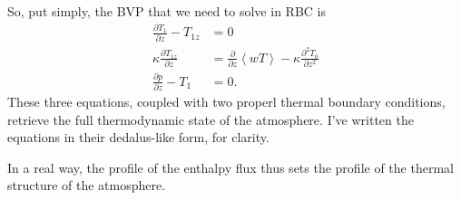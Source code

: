 \documentclass[aps, pre, onecolumn, nofootinbib, notitlepage, groupedaddress, amsfonts, amssymb, amsmath, longbibliography]{revtex4-1}
\newcommand{\angles}[1]{\ensuremath{\left\langle #1 \right\rangle}}
\begin{document}
\begin{enumerate}
So, put simply, the BVP that we need to solve in RBC is 
\begin{equation}
\begin{split}
\frac{\partial T_1}{\partial z} - T_{1z} &= 0 \\
\kappa \frac{\partial T_{1z}}{\partial z} &= \frac{\partial}{\partial z} \angles{w T}  - \kappa \frac{\partial^2 T_0}{\partial z^2}\\
\frac{\partial p}{\partial z} - T_1 &= 0.
\end{split}
\end{equation}
These three equations, coupled with two properl thermal boundary conditions, retrieve the full
thermodynamic state of the atmosphere.  I've written the equations in their dedalus-like form,
for clarity.

In a real way, the profile of the enthalpy flux thus sets the profile of the thermal structure of
the atmosphere.



\end{enumerate}
\end{document}
